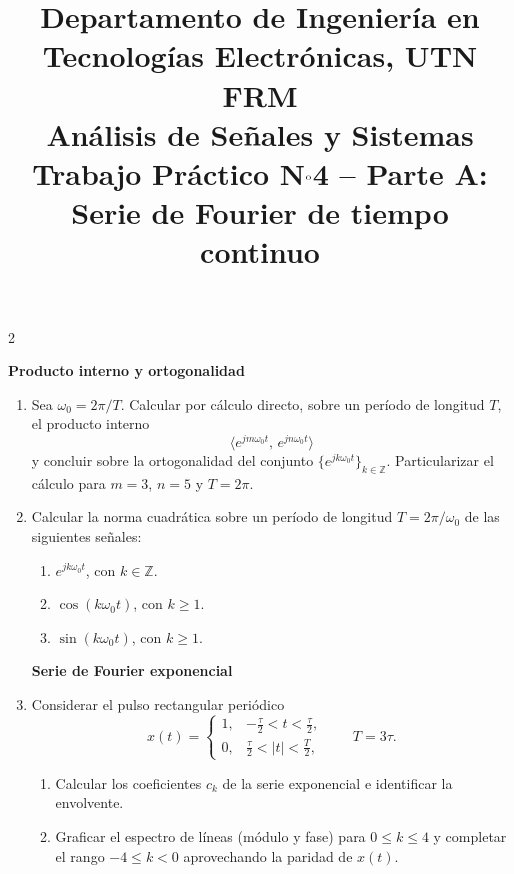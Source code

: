 \documentclass[10pt,a4paper]{article}
\title{%
	{\normalsize Departamento de Ingeniería en Tecnologías Electrónicas, UTN FRM}\\[0.1cm]
	{\large Análisis de Señales y Sistemas}\\[0.15cm]
	{\normalsize Trabajo Práctico N$^{\text o}$4 -- Parte A: Serie de Fourier de tiempo continuo}%
}
\author{}
\date{}
\begin{document}
	\maketitle
	\thispagestyle{fancy}

	\begin{multicols}{2}

		\label{sec:enun}
			\textbf{Producto interno y ortogonalidad}
			\begin{enumerate}
			\item Sea $\omega_0 = 2\pi/T$. Calcular por cálculo directo, sobre un período de longitud $T$, el producto interno
			\[
				\langle e^{jm\omega_0 t},\, e^{jn\omega_0 t}\rangle
			\]
			y concluir sobre la ortogonalidad del conjunto $\{e^{jk\omega_0 t}\}_{k\in\mathbb{Z}}$. Particularizar el cálculo para $m=3$, $n=5$ y $T = 2\pi$.

			\item Calcular la norma cuadrática sobre un período de longitud $T = 2\pi/\omega_0$ de las siguientes señales:
			\begin{enumerate}
				\item $e^{jk\omega_0 t}$, con $k\in\mathbb{Z}$.
				\item $\cos(k\omega_0 t)$, con $k\geq 1$.
				\item $\sin(k\omega_0 t)$, con $k\geq 1$.
			\end{enumerate}

			\textbf{Serie de Fourier exponencial}
			\item Considerar el pulso rectangular periódico
			\[
				x(t) =
				\begin{cases}
					1, & -\tfrac{\tau}{2} < t < \tfrac{\tau}{2}, \\
					0, & \tfrac{\tau}{2} < |t| < \tfrac{T}{2},
				\end{cases}
				\qquad T = 3\tau.
			\]
			\begin{enumerate}
				\item Calcular los coeficientes $c_k$ de la serie exponencial e identificar la envolvente.
				\item Graficar el espectro de líneas (módulo y fase) para $0 \leq k \leq 4$ y completar el rango $-4 \leq k < 0$ aprovechando la paridad de $x(t)$.
			\end{enumerate}


\end{enumerate}
\end{multicols}
\end{document}
